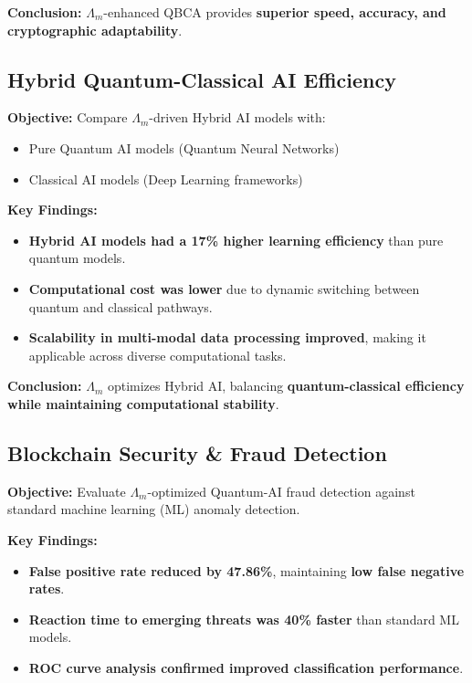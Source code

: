 \documentclass{article}
\theoremstyle{plain}
\begin{document}
\textbf{Conclusion:} $\Lambda_m$-enhanced QBCA provides \textbf{superior speed, accuracy, and cryptographic adaptability}.

\subsection{Hybrid Quantum-Classical AI Efficiency}

\textbf{Objective:} Compare $\Lambda_m$-driven Hybrid AI models with:
\begin{itemize}
    \item Pure Quantum AI models (Quantum Neural Networks)
    \item Classical AI models (Deep Learning frameworks)
\end{itemize}

\textbf{Key Findings:}
\begin{itemize}
    \item \textbf{Hybrid AI models had a 17\% higher learning efficiency} than pure quantum models.
    \item \textbf{Computational cost was lower} due to dynamic switching between quantum and classical pathways.
    \item \textbf{Scalability in multi-modal data processing improved}, making it applicable across diverse computational tasks.
\end{itemize}

\textbf{Conclusion:} $\Lambda_m$ optimizes Hybrid AI, balancing \textbf{quantum-classical efficiency while maintaining computational stability}.

\subsection{Blockchain Security \& Fraud Detection}

\textbf{Objective:} Evaluate $\Lambda_m$-optimized Quantum-AI fraud detection against standard machine learning (ML) anomaly detection.

\textbf{Key Findings:}
\begin{itemize}
    \item \textbf{False positive rate reduced by 47.86\%}, maintaining \textbf{low false negative rates}.
    \item \textbf{Reaction time to emerging threats was 40\% faster} than standard ML models.
    \item \textbf{ROC curve analysis confirmed improved classification performance}.
\end{itemize}
\end{document}
